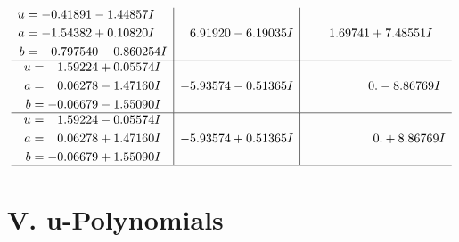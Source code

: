 \documentclass[1p]{elsarticle_modified}
\theoremstyle{definition}
\begin{document}
$$\begin{array}{c|c|c}
\begin{aligned}
u &= -0.41891 - 1.44857 I \\
a &= -1.54382 + 0.10820 I \\
b &= \phantom{-}0.797540 - 0.860254 I\end{aligned}
 & \phantom{-}6.91920 - 6.19035 I & \phantom{-}1.69741 + 7.48551 I \\ \hline\begin{aligned}
u &= \phantom{-}1.59224 + 0.05574 I \\
a &= \phantom{-}0.06278 - 1.47160 I \\
b &= -0.06679 - 1.55090 I\end{aligned}
 & -5.93574 - 0.51365 I & \phantom{-0.000000 } 0. - 8.86769 I \\ \hline\begin{aligned}
u &= \phantom{-}1.59224 - 0.05574 I \\
a &= \phantom{-}0.06278 + 1.47160 I \\
b &= -0.06679 + 1.55090 I\end{aligned}
 & -5.93574 + 0.51365 I & \phantom{-0.000000 -}0. + 8.86769 I\\
 \hline 
 \end{array}$$\newpage
\newpage\renewcommand{\arraystretch}{1}
\centering \section*{ V. u-Polynomials}
\end{document}
